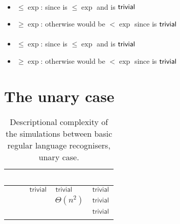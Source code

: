 \paragraph{\ODLA{}\tto\ONFA}
\begin{itemize}
	\item $\le\exp$: since \hyperref[cost:1DLAto1DFA]{\ODLA{}\tto\ODFA} is $\le\exp$ and \ODFA{}\tto\ONFA is $\mathsf{trivial}$
	\item $\ge\exp$: otherwise \hyperref[cost:1DLAto2NFA]{\ODLA{}\tto\TNFA} would be $<\exp$ since \ONFA{}\tto\TNFA is $\mathsf{trivial}$
\end{itemize}
\paragraph{\ODLA{}\tto\TDFA}
\begin{itemize}
	\item $\le\exp$: since \hyperref[cost:1DLAto1DFA]{\ODLA{}\tto\ODFA} is $\le\exp$ and \ODFA{}\tto\TDFA is $\mathsf{trivial}$
	\item $\ge\exp$: otherwise \hyperref[cost:1DLAto2NFA]{\ODLA{}\tto\TNFA} would be $<\exp$ since \TDFA{}\tto\TNFA is $\mathsf{trivial}$
\end{itemize}



\section{The unary case}\label{sec:prevsims-unary}

\begin{table}
	\centering
	\renewcommand{\arraystretch}{1.2}
	\begin{tabular}{|l|l|l|p{4.3em}|l|}
		\hline
		~     & \ODFA           & \ONFA           & \TDFA                                            & \TNFA     \\ \hline
		\ODFA & \cY             & $\Cctriv$       & $\Cctriv$                                        & $\Cctriv$ \\ \hline
		\ONFA & \rbt{$\CsubEq$} & \cY             & \cR $\Theta(n^2)$                                & $\Cctriv$ \\ \hline
		\TDFA & \rbt{$\CsubEq$} & \rbt{$\CsubEq$} & \cY                                              & $\Cctriv$ \\ \hline
		\TNFA & \rbt{$\CsubEq$} & \rbt{$\CsubEq$} & \cR \rbt[.4]{$\le\Csubln$} \rbt[.3]{$\ge\Cpoly$} & \cY       \\ \hline
	\end{tabular}
	\caption{Descriptional complexity of the simulations between basic regular language recognisers, unary case.}
	\label{tab:sims-core-unary}
\end{table}

